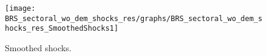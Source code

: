  
\begin{figure}[H]
\centering 
\texttt{[image: BRS\_sectoral\_wo\_dem\_shocks\_res/graphs/BRS\_sectoral\_wo\_dem\_shocks\_res\_SmoothedShocks1]}
\caption{Smoothed shocks.}\label{Fig:SmoothedShocks:1}
\end{figure}



